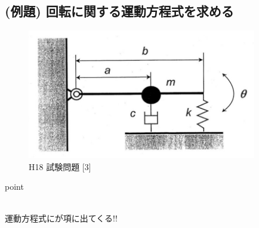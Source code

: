 \documentclass[a4paper]{jsarticle}
\begin{document}
\subsection{(例題) 回転に関する運動方程式を求める}
\begin{figure}[htbp]
    \begin{center}
        \includegraphics[width=100mm]{images/kiriki_image2.jpg}
        \caption{H18 試験問題 [3]}
    \end{center}
\end{figure}
\begin{itembox}[l]{point}
    \begin{center}
        \\
        運動方程式にが項に出てくる!!
    \end{center}
\end{itembox}
\end{document}
